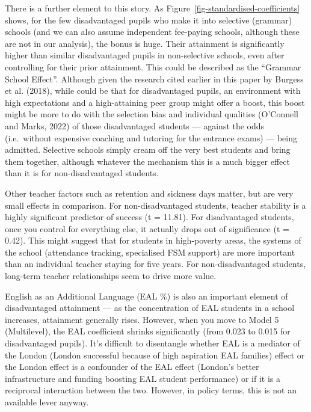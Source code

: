 \documentclass[
  11pt,
]{article}
\begin{document}
There is a further element to this story. As
Figure~\ref{fig-standardised-coefficients} shows, for the few
disadvantaged pupils who make it into selective (grammar) schools (and
we can also assume independent fee-paying schools, although these are
not in our analysis), the bonus is huge. Their attainment is
significantly higher than similar disadvantaged pupils in non-selective
schools, even after controlling for their prior attainment. This could
be described as the ``Grammar School Effect''. Although given the
research cited earlier in this paper by Burgess et al. (2018), while
could be that for disadvantaged pupils, an environment with high
expectations and a high-attaining peer group might offer a boost, this
boost might be more to do with the selection bias and individual
qualities (O'Connell and Marks, 2022) of those disadvantaged students
--- against the odds (i.e.~without expensive coaching and tutoring for
the entrance exams) --- being admitted. Selective schools simply cream
off the very best students and bring them together, although whatever
the mechanism this is a much bigger effect than it is for
non-disadvantaged students.

Other teacher factors such as retention and sickness days matter, but
are very small effects in comparison. For non-disadvantaged students,
teacher stability is a highly significant predictor of success (t =
11.81). For disadvantaged students, once you control for everything
else, it actually drops out of significance (t = 0.42). This might
suggest that for students in high-poverty areas, the systems of the
school (attendance tracking, specialised FSM support) are more important
than an individual teacher staying for five years. For non-disadvantaged
students, long-term teacher relationships seem to drive more value.

English as an Additional Language (EAL \%) is also an important element
of disadvantaged attainment --- as the concentration of EAL students in
a school increases, attainment generally rises. However, when you move
to Model 5 (Multilevel), the EAL coefficient shrinks significantly (from
0.023 to 0.015 for disadvantaged pupils). It's difficult to disentangle
whether EAL is a mediator of the London (London successful because of
high aspiration EAL families) effect or the London effect is a
confounder of the EAL effect (London's better infrastructure and funding
boosting EAL student performance) or if it is a reciprocal interaction
between the two. However, in policy terms, this is not an available
lever anyway.
\end{document}

